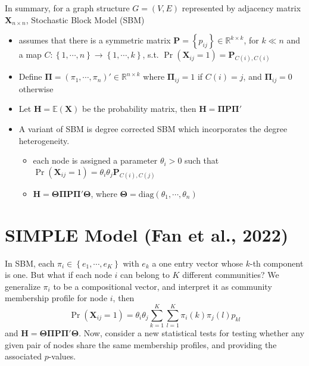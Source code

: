 \documentclass[twoside]{article}
\begin{document}
In summary, for a graph structure $G=(V,E)$ represented by adjacency matrix $\mathbf{X}_{n\times n}$, Stochastic Block Model (SBM)
\begin{itemize}
    \item assumes that there is a symmetric matrix $\mathbf{P} = \left\{ p_{ij} \right\} \in \mathbb{R}^{k\times k}$, for $k \ll n$ and a map $C:\left\{1,\cdots,n\right\} \rightarrow \left\{1,\cdots,k\right\}$, s.t. $\Pr\left(\mathbf{X}_{ij}=1\right) = \mathbf{P}_{C(i),C(i)}$
    \item Define $\boldsymbol{\Pi} = \left(\pi_1,\cdots,\pi_n\right)'\in \mathbb{R}^{n\times k}$ where $\boldsymbol{\Pi}_{ij}=1$ if $C(i)=j$, and $\boldsymbol{\Pi}_{ij}=0$ otherwise
    \item Let $\mathbf{H}= \mathbb{E}(\mathbf{X})$ be the probability matrix, then $\mathbf{H} = \boldsymbol{\Pi}\mathbf{P}\boldsymbol{\Pi}'$
    \item A variant of SBM is degree corrected SBM which incorporates the degree heterogeneity.
    \begin{itemize}
        \item each node is assigned a parameter $\theta_i >0$ such that $\Pr \left(\mathbf{X}_{ij}=1\right) = \theta_i\theta_j \mathbf{P}_{C(i),C(j)}$
        \item $\mathbf{H} = \boldsymbol{\Theta\Pi}\mathbf{P}\boldsymbol{\Pi'\Theta}$, where $\boldsymbol{\Theta} = \mathrm{diag} \left(\theta_1,\cdots,\theta_n\right)$
    \end{itemize}
\end{itemize}

\section{SIMPLE Model (Fan et al., 2022)}
In SBM, each $\pi_i\in\left\{e_1,\cdots,e_K \right\}$ with $e_k$ a one entry vector whose $k$-th component is one. But what if each node $i$ can belong to $K$ different communities? We generalize $\pi_i$ to be a compositional vector, and interpret it as community membership profile for node $i$, then 
$$
\Pr\left(\mathbf{X}_{ij}=1\right) = \theta_i\theta_j \sum^K_{k=1} \sum^K_{l=1} \pi_i(k)\pi_j(l)p_{kl}
$$
and $\mathbf{H} = \boldsymbol{\Theta\Pi}\mathbf{P}\boldsymbol{\Pi'\Theta}$. Now, consider a new statistical tests for testing whether any given pair of nodes share the same membership profiles, and providing the associated $p$-values.
\end{document}
